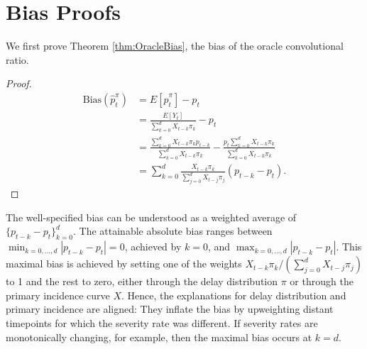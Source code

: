 \documentclass{article}
\begin{document}
\pagebreak
\appendix
\section{Bias Proofs}\label{apx:proofs}

We first prove Theorem \ref{thm:OracleBias}, the bias of the oracle convolutional ratio. 
\begin{proof}
    \begin{align*}%
    \text{Bias}(\hat{p}_t^\pi) &= E[\hat{p}_t^\pi] - p_t \\
    &= \frac{E[Y_t]}{\sum_{k=0}^d X_{t-k}\pi_k} - p_t \\ 
    &= \frac{\sum_{k=0}^d X_{t-k}\pi_k p_{t-k}}{\sum_{k=0}^d X_{t-k}\pi_k} - \frac{p_t \sum_{k=0}^d X_{t-k}\pi_k}{\sum_{k=0}^d X_{t-k}\pi_k}\\
    &= \sum_{k=0}^d \frac{X_{t-k}\pi_k}{\sum_{j=0}^d X_{t-j}\pi_j} (p_{t-k}-p_t).
\end{align*}
\end{proof}
The well-specified bias can be understood as a weighted average of $\{p_{t-k}-p_t\}_{k=0}^d$. The attainable absolute bias ranges between $\min_{k=0, \dotsc, d} |p_{t-k}-p_t| = 0$, achieved by $k=0$, and $\max_{k=0, \dotsc, d} |p_{t-k}-p_t|$. This maximal bias is achieved by setting one of the weights
$X_{t-k}\pi_k/(\sum_{j=0}^d X_{t-j}\pi_j)$ to 1 and the rest to zero,
either through the delay distribution $\pi$ or through the primary incidence curve $X$. Hence, the explanations for delay distribution and primary incidence are aligned: They inflate the bias by upweighting distant timepoints for which the severity rate was different. If severity rates are monotonically changing, for example, then the maximal bias occurs at $k=d$. 
\end{document}
